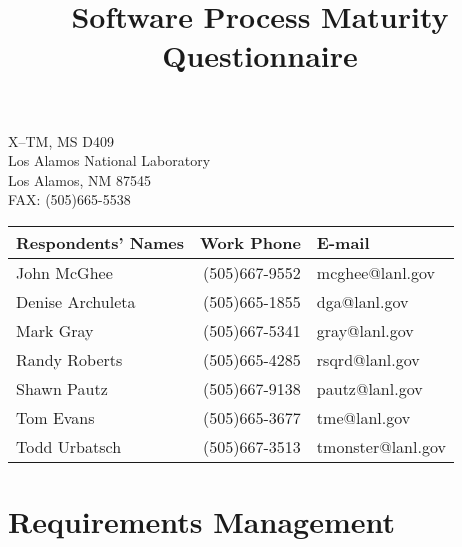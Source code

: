 \documentclass{questionaire}
\title{Software Process Maturity Questionnaire}
\begin{document}
\maketitle
\begin{center}
\parbox{35ex}{X--TM, MS D409\\
Los Alamos National Laboratory\\
Los Alamos, NM 87545\\
FAX: (505)665-5538\\}

\begin{tabular}{|l|r|l|} \hline
{\bf Respondents' Names} & {\bf Work Phone} & {\bf E-mail} \\ \hline
John McGhee              & (505)667-9552    & mcghee@lanl.gov \\
Denise Archuleta         & (505)665-1855    & dga@lanl.gov \\
Mark Gray                & (505)667-5341    & gray@lanl.gov \\
Randy Roberts            & (505)665-4285    & rsqrd@lanl.gov \\
Shawn Pautz              & (505)667-9138    & pautz@lanl.gov \\
Tom Evans                & (505)665-3677    & tme@lanl.gov \\
Todd Urbatsch            & (505)667-3513    & tmonster@lanl.gov \\ \hline
\end{tabular}
\end{center}

\newpage
\section{Requirements Management}

\begin{KPAActivity}
\end{KPAActivity}
\end{document}
